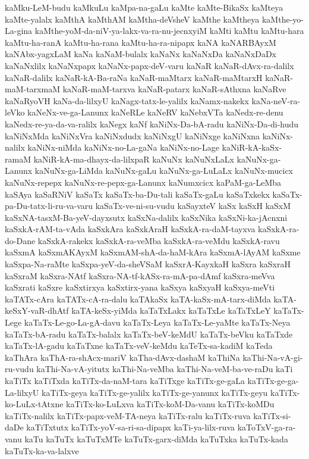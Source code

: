 {kaMku-LeM-budu
kaMkuLu
kaMpa-na-gaLu
kaMte
kaMte-BikaSx
kaMteya
kaMte-yalalx
kaMthA
kaMthAM
kaMtha-deVsheV
kaMthe
kaMtheya
kaMthe-yo-La-gina
kaMthe-yoM-da-niV-ya-lakx-va-ra-nu-jecnxyiM
kaMti
kaMtu
kaMtu-hara
kaMtu-ha-ranA
kaMtu-ha-rana
kaMtu-ha-ra-nipapx
kaNA
kaNARBAyxM
kaNAbx-yagxLaM
kaNa
kaNaM-bulalx
kaNaNx
kaNaNxDa
kaNaNxDaDx
kaNaNxlilx
kaNaNxpapx
kaNaNx-papx-deV-varu
kaNaR
kaNaR-dAvx-ra-dalilx
kaNaR-dalilx
kaNaR-kA-Ba-raNa
kaNaR-maMtarx
kaNaR-maMtarxH
kaNaR-maM-tarxmaM
kaNaR-maM-tarxva
kaNaR-patarx
kaNaR-sAthxna
kaNaRve
kaNaRyoVH
kaNa-da-lilxyU
kaNagx-tatx-le-yalilx
kaNamx-nakekx
kaNa-neV-ra-leVko
kaNeNx-ve-ga-Lanunx
kaNeRLe
kaNeRV
kaNebxVTa
kaNedx-re-denu
kaNedx-re-ya-da-va-ralilx
kaNegx
kaNf
kaNiNx-Da-bA-radu
kaNiNx-Da-di-hudu
kaNiNxMda
kaNiNxVra
kaNiNxdudx
kaNiNxgU
kaNiNxge
kaNiNxna
kaNiNx-nalilx
kaNiNx-niMda
kaNiNx-no-La-gaNa
kaNiNx-no-Lage
kaNiR-kA-kaSx-ramaM
kaNiR-kA-ma-dhayx-da-lilxpaR
kaNuNx
kaNuNxLaLx
kaNuNx-ga-Lanunx
kaNuNx-ga-LiMda
kaNuNx-gaLu
kaNuNx-ga-LuLaLx
kaNuNx-mucicx
kaNuNx-repepx
kaNuNx-re-pepx-ga-Lanunx
kaNumxcicx
kaPaM-ga-LeMba
kaSAya
kaSaRNiV
kaSaTx
kaSaTx-ba-Du-tali
kaSaTx-gaLu
kaSaTxkekx
kaSaTx-pa-Du-tatx-li-ru-va-varu
kaSaTx-ve-ni-su-vudu
kaSayxteV
kaSx
kaSxH
kaSxM
kaSxNA-tasxM-Ba-yeV-dayxsutx
kaSxNa-dalilx
kaSxNika
kaSxNi-ka-jAcnxni
kaSxkA-rAM-ta-vAda
kaSxkAra
kaSxkAraH
kaSxkA-ra-daM-tayxva
kaSxkA-ra-do-Dane
kaSxkA-rakekx
kaSxkA-ra-veMba
kaSxkA-ra-veMdu
kaSxkA-ravu
kaSxmA
kaSxmAKAyxM
kaSxmAM-shA-da-haM-kAra
kaSxmA-lAyAM
kaSxme
kaSxpa-Na-raMte
kaSxpa-yeV-da-sheVSaM
kaSxrA-KayxkaH
kaSxra
kaSxraH
kaSxraM
kaSxra-NAtf
kaSxra-NA-tf-kASx-ra-mA-pa-dAmf
kaSxra-meVva
kaSxrati
kaSxre
kaSxtirxya
kaSxtirx-yana
kaSxya
kaSxyaH
kaSxya-meVti
kaTATx-cAra
kaTATx-cA-ra-dalu
kaTAkaSx
kaTA-kaSx-mA-tarx-diMda
kaTA-keSxY-vaR-dhAtf
kaTA-keSx-yiMda
kaTaTxLakx
kaTaTxLe
kaTaTxLeY
kaTaTx-Lege
kaTaTx-Le-go-La-gA-davu
kaTaTx-Leya
kaTaTx-Le-yaMte
kaTaTx-Neya
kaTaTx-bA-radu
kaTaTx-balalx
kaTaTx-beV-keMdU
kaTaTx-beVku
kaTaTxde
kaTaTx-lA-gadu
kaTaTxne
kaTaTx-veV-keMdu
kaTeTx-sa-kadiM
kaTeda
kaThAra
kaThA-ra-shAcx-mariV
kaTha-dAvx-dashaM
kaThiNa
kaThi-Na-vA-gi-ru-vudu
kaThi-Na-vA-yitutx
kaThi-Na-veMba
kaThi-Na-veM-ba-ve-raDu
kaTi
kaTiTx
kaTiTxda
kaTiTx-da-naM-tara
kaTiTxge
kaTiTx-ge-gaLa
kaTiTx-ge-ga-La-lilxyU
kaTiTx-geya
kaTiTx-ge-yalilx
kaTiTx-ge-yanunx
kaTiTx-geyu
kaTiTx-ko-LuLx-tAtxne
kaTiTx-ko-LuLxva
kaTiTx-koM-Da-vanu
kaTiTx-koMDu
kaTiTx-nalilx
kaTiTx-papx-veM-TA-neya
kaTiTx-ralu
kaTiTx-ruva
kaTiTx-si-daDe
kaTiTxtutx
kaTiTx-yoV-sa-ri-sa-dipapx
kaTi-ya-lilx-ruva
kaToTxV-ga-ra-vanu
kaTu
kaTuTx
kaTuTxMTe
kaTuTx-garx-diMda
kaTuTxka
kaTuTx-kada
kaTuTx-ka-va-lalxve
}
